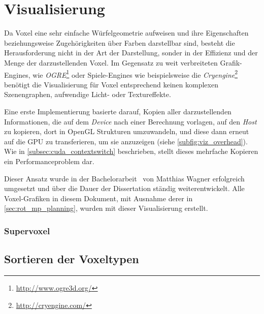 





\section{Visualisierung}
\label{sec:visualization}

Da Voxel eine sehr einfache Würfelgeometrie aufweisen und ihre Eigenschaften beziehungsweise Zugehörigkeiten über Farben darstellbar sind, besteht die Herausforderung nicht in der Art der Darstellung, sonder in der Effizienz und der Menge der darzustellenden Voxel.
Im Gegensatz zu weit verbreiteten Grafik-Engines, wie \textit{OGRE}\footnote{\url{http://www.ogre3d.org/}} oder Spiele-Engines wie beispielsweise die \textit{Cryengine}\footnote{\url{http://cryengine.com/}} benötigt die Visualisierung für Voxel entsprechend keinen komplexen Szenengraphen, aufwendige Licht- oder Textureffekte.

Eine erste Implementierung basierte darauf, Kopien aller darzustellenden Informationen, die auf dem \textit{\Gls{Device}} nach einer Berechnung vorlagen, auf den \textit{\Gls{Host}} zu kopieren, dort in \Gls{OpenGL} Strukturen umzuwandeln, und diese dann erneut auf die \Gls{GPU} zu transferieren, um sie anzuzeigen (siehe \cref{subfig:viz_overhead}).
Wie in \cref{subsec:cuda_contextswitch} beschrieben, stellt dieses mehrfache Kopieren ein Performanceproblem dar.

Dieser Ansatz wurde in der Bachelorarbeit~ von Matthias Wagner erfolgreich umgesetzt und über die Dauer der Dissertation ständig weiterentwickelt.
Alle Voxel-Grafiken in diesem Dokument, mit Ausnahme derer in \cref{sec:rot_mp_planning}, wurden mit dieser Visualisierung erstellt.





\subsubsection{Supervoxel}



\subsection{Sortieren der Voxeltypen}

